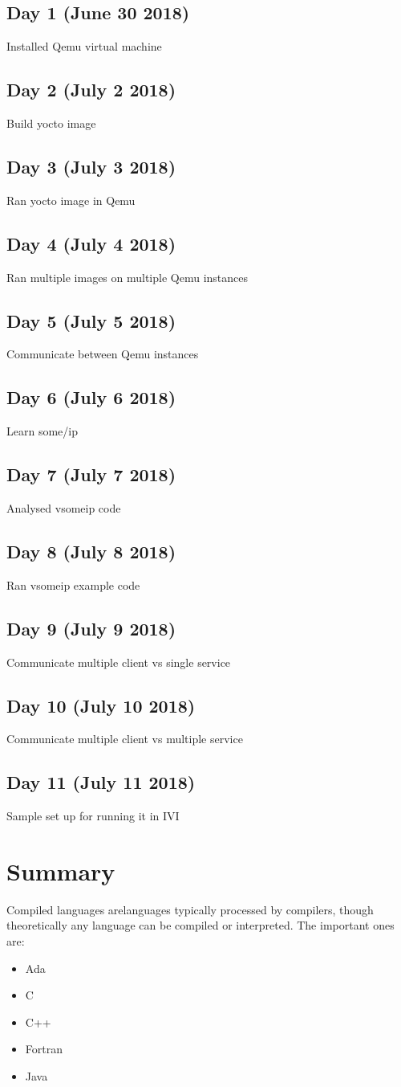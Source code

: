 \documentclass{fisattraining}
\begin{document}
\section{Day 1 (June 30 2018)}
Installed Qemu virtual machine
\section{Day 2 (July 2 2018)}
Build yocto image
\section{Day 3 (July 3 2018)}
Ran yocto image in Qemu
\section{Day 4 (July 4 2018)}
Ran multiple images on multiple Qemu instances
\section{Day 5 (July 5 2018)}
Communicate between Qemu instances
\section{Day 6 (July 6 2018)}
Learn some/ip
\section{Day 7 (July 7 2018)}
Analysed vsomeip code
\section{Day 8 (July 8 2018)}
Ran vsomeip example code
\section{Day 9 (July 9 2018)}
Communicate multiple client vs single service
\section{Day 10 (July 10 2018)}
Communicate multiple client vs multiple service
\section{Day 11 (July 11 2018)}
Sample set up for running it in IVI
\chapter{Summary}

Compiled languages arelanguages typically processed by compilers, though theoretically any language can be compiled or interpreted. The important ones are:
\begin{itemize}
\item Ada
\item C
\item C++
\item Fortran
\item Java
\end{itemize}
\end{document}
